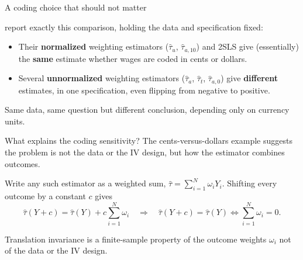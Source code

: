 \documentclass[11pt]{beamer}
\begin{document}
\begin{frame}{A coding choice that should not matter}

\vspace{0.2cm}
\citet{sloczynski2025abadie} report exactly this comparison, holding the data and specification fixed:

\vspace{0.2cm}
\begin{itemize}
\item Their \textbf{normalized} weighting estimators ($\hat\tau_u$, $\hat\tau_{a,10}$) and 2SLS give (essentially) the \textbf{same} estimate whether wages are coded in cents or dollars.
\item Several \textbf{unnormalized} weighting estimators ($\hat\tau_a$, $\hat\tau_t$, $\hat\tau_{a,0}$) give \textbf{different} estimates, in one specification, even flipping from negative to positive.
\end{itemize}

\vspace{0.3cm}
\centering \alert{Same data, same question but different conclusion, depending only on currency units.}
\end{frame}

\begin{frame}{What explains the coding sensitivity?}
The cents-versus-dollars example suggests the problem is not the data or the IV design, but how the estimator combines outcomes.

\vspace{0.25cm}
Write any such estimator as a weighted sum, $\hat\tau = \sum_{i=1}^N \omega_i Y_i$. Shifting every outcome by a constant $c$ gives
\[
\hat\tau(Y+c) = \hat\tau(Y) + c\sum_{i=1}^N \omega_i
\quad\Longrightarrow\quad
\hat\tau(Y+c)=\hat\tau(Y) \iff \sum_{i=1}^N \omega_i = 0.
\]

\vspace{0.3cm}
\centering
\alert{Translation invariance is a finite-sample property of the outcome weights $\omega_i$ not of the data or the IV design.}
\end{frame}
\end{document}
